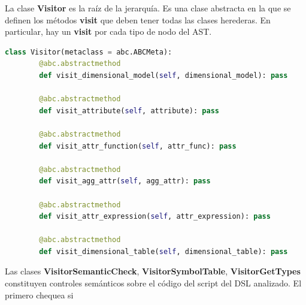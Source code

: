 La clase \textbf{Visitor} es la ra\'iz de la jerarqu\'ia. Es una clase abstracta en la que se definen los m\'etodos 
\textbf{visit} que deben tener todas las clases herederas. En particular, hay un \textbf{visit} por cada tipo de 
nodo del AST. 

\begin{lstlisting}[label={code:visitors}, caption={Clase Visitor}, language={python}]
    class Visitor(metaclass = abc.ABCMeta):
        @abc.abstractmethod
        def visit_dimensional_model(self, dimensional_model): pass 

        @abc.abstractmethod
        def visit_attribute(self, attribute): pass

        @abc.abstractmethod
        def visit_attr_function(self, attr_func): pass

        @abc.abstractmethod
        def visit_agg_attr(self, agg_attr): pass

        @abc.abstractmethod
        def visit_attr_expression(self, attr_expression): pass

        @abc.abstractmethod
        def visit_dimensional_table(self, dimensional_table): pass
\end{lstlisting}

Las clases \textbf{VisitorSemanticCheck}, \textbf{VisitorSymbolTable}, \textbf{VisitorGetTypes} constituyen 
controles sem\'anticos sobre el c\'odigo del script del DSL analizado. El primero chequea si 